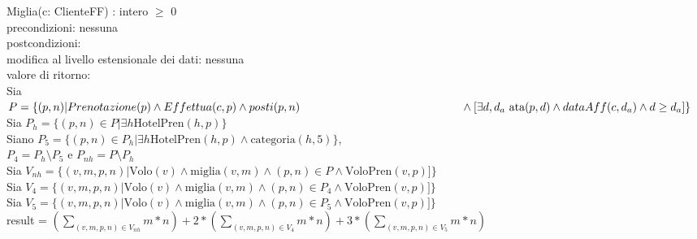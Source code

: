 \documentclass[a4paper,12pt]{report}
\begin{document}
        \hspace*{-0.6cm}
        \hspace*{1cm}Miglia(c: ClienteFF) : intero $\geq$ 0 \\
        \hspace*{2cm}precondizioni: nessuna \\
        \hspace*{2cm}postcondizioni: \\
        \hspace*{3cm}modifica al livello estensionale dei dati: nessuna \\
        \hspace*{3cm}valore di ritorno: \\
        \hspace*{4cm}Sia $P = \{(p, n) | Prenotazione(p) \wedge Effettua(c, p) \wedge posti(p, n) \\
        \hspace*{5cm}\wedge [\exists d,d_a \text{ ata}(p, d) \wedge dataAff(c, d_a) \wedge d \geq d_a]\}$ \\
        \hspace*{4cm}Sia $P_h = \{(p, n) \in P | \exists h \text{HotelPren}(h, p)\}$ \\
        \hspace*{4cm}Siano $P_5 = \{(p, n) \in P_h | \exists h \text{HotelPren}(h, p) \wedge \text{categoria}(h, 5)\}$, \\
        \hspace*{5cm}$P_4 = P_h \setminus P_5$ e $P_{nh} = P \setminus P_h$ \\
        \hspace*{4cm}Sia $V_{nh} = \{(v, m, p, n) | \text{Volo}(v) \wedge \text{miglia}(v, m) \wedge (p, n) \in P \wedge \text{VoloPren}(v, p)]\}$ \\
        \hspace*{4cm}Sia $V_4 = \{(v, m, p, n) | \text{Volo}(v) \wedge \text{miglia}(v, m) \wedge (p, n) \in P_4 \wedge \text{VoloPren}(v, p)]\}$ \\
        \hspace*{4cm}Sia $V_5 = \{(v, m, p, n) | \text{Volo}(v) \wedge \text{miglia}(v, m) \wedge (p, n) \in P_5 \wedge \text{VoloPren}(v, p)]\}$ \\
        \hspace*{4cm}result = $\left(\sum_{(v, m, p, n) \in V_{nh}} m*n\right) + 2*\left(\sum_{(v, m, p, n) \in V_4} m*n\right) + 3*\left(\sum_{(v, m, p, n) \in V_5} m*n\right)$ \\ \\
\end{document}
